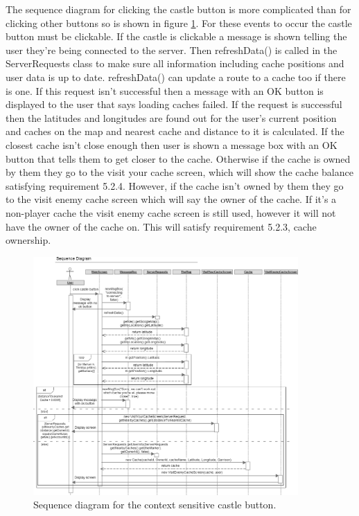 \noindent
The sequence diagram for clicking the castle button is more complicated than for clicking other buttons so is shown in figure \ref{fig:castleButton}. For these events to occur the castle button must be clickable. If the castle is clickable a message is shown telling the user they're being connected to the server. Then refreshData() is called in the ServerRequests class to make sure all information including cache positions and user data is up to date. refreshData() can update a route to a cache too if there is one. If this request isn't successful then a message with an OK button is displayed to the user that says loading caches failed. If the request is successful then the latitudes and longitudes are found out for the user's current position and caches on the map and nearest cache and distance to it is calculated. If the closest cache isn't close enough then user is shown a message box with an OK button that tells them to get closer to the cache. Otherwise if the cache is owned by them they go to the visit your cache screen, which will show the cache balance satisfying requirement 5.2.4. However, if the cache isn't owned by them they go to the visit enemy cache screen which will say the owner of the cache. If it's a non-player cache the visit enemy cache screen is still used, however it will not have the owner of the cache on. This will satisfy requirement 5.2.3, cache ownership.

\newpage
\begin{figure}
    \centering
    \includegraphics[width=0.9\textwidth]{images/sequence/castleButton}
    \caption{Sequence diagram for the context sensitive castle button.}
    \label{fig:castleButton}
\end{figure}

